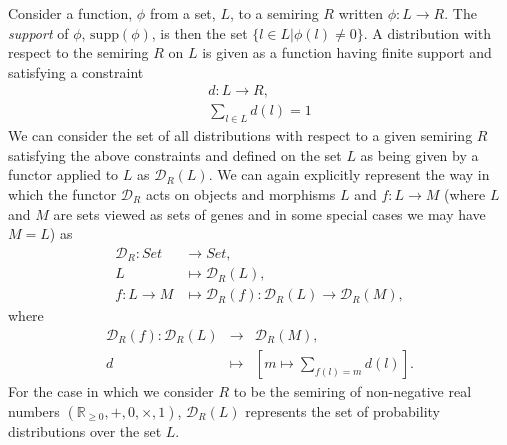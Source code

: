 Consider a function, $\phi$ from a set, $L$, to a semiring $R$ written $\phi \colon L \rightarrow R$. The \emph{support} of $\phi$, $\text{supp}(\phi)$, is then the set $\{ l \in L | \phi(l) \neq 0 \}$. A distribution with respect to the semiring $R$ on $L$ is given as a function having finite support and satisfying a constraint
\begin{eqnarray*}
d \colon L \rightarrow R,\\
\sum_{l \in L} d(l) = 1
\end{eqnarray*}
We can consider the set of all distributions with respect to a given semiring $R$ satisfying the above constraints and defined on the set $L$ as being given by a functor applied to $L$ as $\mathcal{D}_R (L)$. We can again explicitly represent the way in which the functor $\mathcal{D}_R$ acts on objects and morphisms $L$ and $f \colon L \rightarrow M$ (where $L$ and $M$ are sets viewed as sets of genes and in some special cases we may have $M=L$) as
\begin{equation}\label{eq:distfunctor}
\begin{split}
\mathcal{D}_R \colon Set &\rightarrow Set,\\
L &\mapsto \mathcal{D}_R (L),\\
f \colon L \rightarrow M &\mapsto \mathcal{D}_R (f) \colon \mathcal{D}_R (L) \rightarrow \mathcal{D}_R (M),
\end{split}
\end{equation}
where
\begin{eqnarray*}
\mathcal{D}_R (f) \colon \mathcal{D}_R (L) &\rightarrow& \mathcal{D}_R (M),\\
d &\mapsto& \left[ m \mapsto \sum_{f(l)=m} d(l) \right].
\end{eqnarray*}
For the case in which we consider $R$ to be the semiring of non-negative real numbers $\left( \mathbb{R}_{\geq 0},+,0,\times,1 \right)$, $\mathcal{D}_R (L)$ represents the set of probability distributions over the set $L$.

